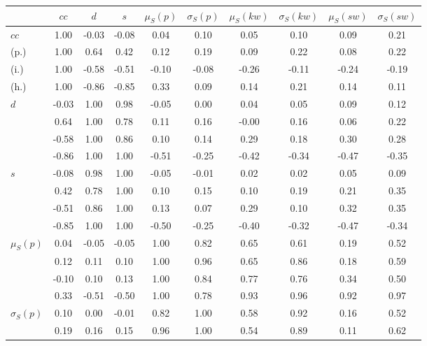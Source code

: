 \begin{table*}[h!]
\begin{center}
\begin{tabular}{| l | c | c | c | c | c | c | c | c | c |}\hline
 & $cc$ & $d$ & $s$ & $\mu_S(p)$ & $\sigma_S(p)$ & $\mu_S(kw)$ & $\sigma_S(kw)$ & $\mu_S(sw)$ & $\sigma_S(sw)$ \\\hline
$cc$ & 1.00  & -0.03  & -0.08  & 0.04  & 0.10  & 0.05  & 0.10  & 0.09  & 0.21 \\\hline
(p.) & 1.00  & 0.64  & 0.42  & 0.12  & 0.19  & 0.09  & 0.22  & 0.08  & 0.22 \\\hline
(i.) & 1.00  & -0.58  & -0.51  & -0.10  & -0.08  & -0.26  & -0.11  & -0.24  & -0.19 \\\hline
(h.) & 1.00  & -0.86  & -0.85  & 0.33  & 0.09  & 0.14  & 0.21  & 0.14  & 0.11 \\\hline
$d$ & -0.03  & 1.00  & 0.98  & -0.05  & 0.00  & 0.04  & 0.05  & 0.09  & 0.12 \\\hline
 & 0.64  & 1.00  & 0.78  & 0.11  & 0.16  & -0.00  & 0.16  & 0.06  & 0.22 \\\hline
 & -0.58  & 1.00  & 0.86  & 0.10  & 0.14  & 0.29  & 0.18  & 0.30  & 0.28 \\\hline
 & -0.86  & 1.00  & 1.00  & -0.51  & -0.25  & -0.42  & -0.34  & -0.47  & -0.35 \\\hline
$s$ & -0.08  & 0.98  & 1.00  & -0.05  & -0.01  & 0.02  & 0.02  & 0.05  & 0.09 \\\hline
 & 0.42  & 0.78  & 1.00  & 0.10  & 0.15  & 0.10  & 0.19  & 0.21  & 0.35 \\\hline
 & -0.51  & 0.86  & 1.00  & 0.13  & 0.07  & 0.29  & 0.10  & 0.32  & 0.35 \\\hline
 & -0.85  & 1.00  & 1.00  & -0.50  & -0.25  & -0.40  & -0.32  & -0.47  & -0.34 \\\hline
$\mu_S(p)$ & 0.04  & -0.05  & -0.05  & 1.00  & 0.82  & 0.65  & 0.61  & 0.19  & 0.52 \\\hline
 & 0.12  & 0.11  & 0.10  & 1.00  & 0.96  & 0.65  & 0.86  & 0.18  & 0.59 \\\hline
 & -0.10  & 0.10  & 0.13  & 1.00  & 0.84  & 0.77  & 0.76  & 0.34  & 0.50 \\\hline
 & 0.33  & -0.51  & -0.50  & 1.00  & 0.78  & 0.93  & 0.96  & 0.92  & 0.97 \\\hline
$\sigma_S(p)$ & 0.10  & 0.00  & -0.01  & 0.82  & 1.00  & 0.58  & 0.92  & 0.16  & 0.52 \\\hline
 & 0.19  & 0.16  & 0.15  & 0.96  & 1.00  & 0.54  & 0.89  & 0.11  & 0.62 \\\hline

\end{tabular}
\end{center}
\end{table*}
